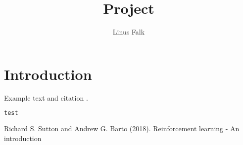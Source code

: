 \documentclass[a4paper,10pt]{article}
\title{Project}
\author{Linus Falk}
\begin{document}
\maketitle
\section{Introduction}
Example text and citation \cite{dqn1}.
\begin{lstlisting}[language=Python]
test
\end{lstlisting}


\begin{thebibliography}{1}


 Richard S. Sutton and Andrew G. Barto (2018). Reinforcement learning - An introduction


\end{thebibliography}
\end{document}
